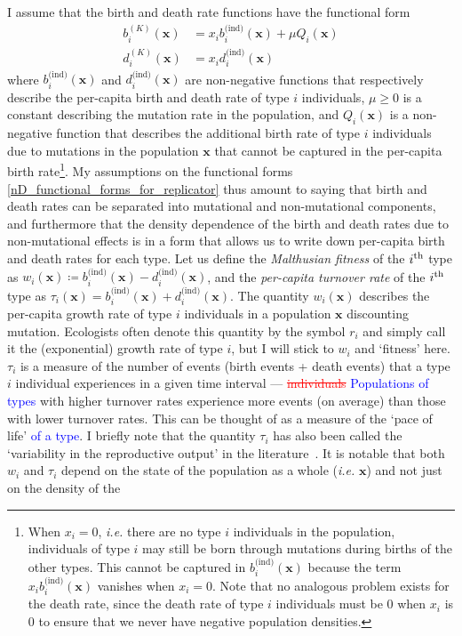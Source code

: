 I assume that the birth and death rate functions have the functional form
\begin{equation}
\label{nD_functional_forms_for_replicator}
\begin{aligned}
b^{(K)}_i(\mathbf{x}) &= x_ib^{\textrm{(ind)}}_{i}(\mathbf{x}) + \mu Q_i(\mathbf{x})\\
d^{(K)}_i(\mathbf{x}) &= x_id^{\textrm{(ind)}}_i(\mathbf{x})
\end{aligned}
\end{equation}
where $b^{\textrm{(ind)}}_{i}(\mathbf{x})$ and $d^{\textrm{(ind)}}_{i}(\mathbf{x})$ are non-negative functions that respectively describe the per-capita birth and death rate of type $i$ individuals, $\mu \geq 0$ is a constant describing the mutation rate in the population, and $Q_i(\mathbf{x})$ is a non-negative function that describes the additional birth rate of type $i$ individuals due to mutations in the population $\mathbf{x}$ that cannot be captured in the per-capita birth rate\footnote{When $x_i = 0$, \emph{i.e.} there are no type $i$ individuals in the population, individuals of type $i$ may still be born through mutations during births of the other types. This cannot be captured in $b^{\textrm{(ind)}}_{i}(\mathbf{x})$ because the term $x_ib^{\textrm{(ind)}}_{i}(\mathbf{x})$ vanishes when $x_i = 0$. Note that no analogous problem exists for the death rate, since the death rate of type $i$ individuals must be 0 when $x_i$ is 0 to ensure that we never have negative population densities.}. My assumptions on the functional forms \eqref{nD_functional_forms_for_replicator} thus amount to saying that birth and death rates can be separated into mutational and non-mutational components, and furthermore that the density dependence of the birth and death rates due to non-mutational effects is in a form that allows us to write down per-capita birth and death rates for each type. Let us define the \emph{Malthusian fitness} of the $i\textsuperscript{th}$ type as $w_i(\mathbf{x}) \coloneqq b^{\textrm{(ind)}}_{i}(\mathbf{x}) - d^{\textrm{(ind)}}_{i}(\mathbf{x})$, and the \emph{per-capita turnover rate} of the $i\textsuperscript{th}$ type as $\tau_i(\mathbf{x}) = b^{\textrm{(ind)}}_{i}(\mathbf{x}) + d^{\textrm{(ind)}}_{i}(\mathbf{x})$.  The quantity $w_i(\mathbf{x})$ describes the per-capita growth rate of type $i$ individuals in a population $\mathbf{x}$ discounting mutation. Ecologists often denote this quantity by the symbol $r_i$ and simply call it the (exponential) growth rate of type $i$, but I will stick to $w_i$ and `fitness' here. $\tau_i$ is a measure of the number of events (birth events + death events) that a type $i$ individual experiences in a given time interval --- \textcolor{red}{\st{individuals}} \textcolor{blue}{Populations of types} with higher turnover rates experience more events (on average) than those with lower turnover rates. This can be thought of as a measure of the `pace of life' \textcolor{blue}{of a type}. I briefly note that the quantity $\tau_i$ has also been called the `variability in the reproductive output' in the literature~\citep{gillespie_natural_1974}. It is notable that both $w_i$ and $\tau_i$ depend on the state of the population as a whole (\textit{i.e.} $\mathbf{x}$) and not just on the density of the 